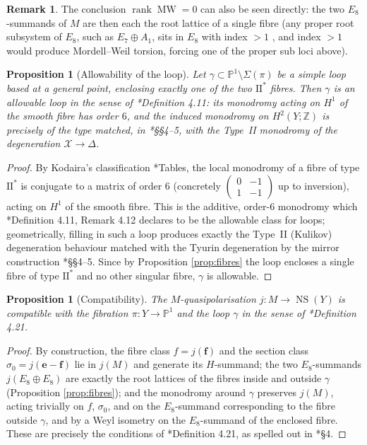 \documentclass[11pt]{amsart}
\theoremstyle{plain}
\newtheorem{proposition}[theorem]{Proposition}
\theoremstyle{definition}
\newtheorem{remark}[theorem]{Remark}
\newcommand{\Z}{\mathbb{Z}}
\newcommand{\Pn}{\mathbb{P}^1}
\newcommand{\NS}{\operatorname{NS}}
\newcommand{\cX}{\mathcal{X}}
\newcommand{\e}{\mathbf{e}}
\newcommand{\ff}{\mathbf{f}}
\begin{document}
\begin{remark}
The conclusion $\operatorname{rank}\operatorname{MW}=0$ can also be seen
directly: the two $E_8$-summands of $M$ are then each the root lattice of a
single fibre (any proper root subsystem of $E_8$, such as
$E_7\oplus A_1$, sits in $E_8$ with index $>1$ \cite{Dyn57}, and index $>1$
would produce Mordell--Weil torsion, forcing one of the proper sub loci above).
\end{remark}

\begin{proposition}[Allowability of the loop]\label{prop:loop}
Let $\gamma\subset\Pn\setminus\Sigma(\pi)$ be a simple loop based at a general
point, enclosing exactly one of the two $\mathrm{II}^*$ fibres. Then
$\gamma$ is an allowable loop in the sense of
\cite{dfk3slpms}*{Definition 4.11}: its monodromy acting on
$H^1$ of the smooth fibre has order $6$, and the induced monodromy on
$H^2(Y;\Z)$ is precisely of the type matched, in
\cite{dfk3slpms}*{\S\S 4--5}, with the Type~II monodromy of the degeneration
$\cX\to\Delta$.
\end{proposition}

\begin{proof}
By Kodaira's classification \cite{Kod63}*{Tables}, the local monodromy of a
fibre of type $\mathrm{II}^*$ is conjugate to a matrix of order $6$
(concretely $\left(\begin{smallmatrix}0&-1\\1&-1\end{smallmatrix}\right)$ up to
inversion), acting on $H^1$ of the smooth fibre. This is the additive,
order-$6$ monodromy which \cite{dfk3slpms}*{Definition 4.11, Remark 4.12}
declares to be the allowable class for loops; geometrically, filling in such a
loop produces exactly the Type~II (Kulikov) degeneration behaviour matched
with the Tyurin degeneration by the mirror construction
\cite{dfk3slpms}*{\S\S 4--5}. Since by Proposition \ref{prop:fibres} the loop
encloses a single fibre of type $\mathrm{II}^*$ and no other singular fibre,
$\gamma$ is allowable.
\end{proof}

\begin{proposition}[Compatibility]\label{prop:compatibility}
The $M$-quasipolarisation $j\colon M\to\NS(Y)$ is compatible with the fibration
$\pi\colon Y\to\Pn$ and the loop $\gamma$ in the sense of
\cite{dfk3slpms}*{Definition 4.21}.
\end{proposition}

\begin{proof}
By construction, the fibre class $f=j(\ff)$ and the section class
$\sigma_0=j(\e-\ff)$ lie in $j(M)$ and generate its $H$-summand; the two
$E_8$-summands $j(E_8\oplus E_8)$ are exactly the root lattices of the fibres
inside and outside $\gamma$ (Proposition \ref{prop:fibres}); and the monodromy
around $\gamma$ preserves $j(M)$, acting trivially on $f$, $\sigma_0$, and on
the $E_8$-summand corresponding to the fibre outside $\gamma$, and by a Weyl
isometry on the $E_8$-summand of the enclosed fibre. These are precisely the
conditions of \cite{dfk3slpms}*{Definition 4.21}, as spelled out in
\cite{dfk3slpms}*{\S 4}.
\end{proof}
\end{document}
